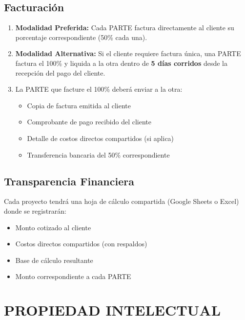 \documentclass[11pt,letterpaper]{article}
\begin{document}
\subsection{Facturación}

\begin{enumerate}[label=\arabic*.]
    \item \textbf{Modalidad Preferida:} Cada PARTE factura directamente al cliente su porcentaje correspondiente (50\% cada una).
    
    \item \textbf{Modalidad Alternativa:} Si el cliente requiere factura única, una PARTE factura el 100\% y liquida a la otra dentro de \textbf{5 días corridos} desde la recepción del pago del cliente.
    
    \item La PARTE que facture el 100\% deberá enviar a la otra:
    \begin{itemize}
        \item Copia de factura emitida al cliente
        \item Comprobante de pago recibido del cliente
        \item Detalle de costos directos compartidos (si aplica)
        \item Transferencia bancaria del 50\% correspondiente
    \end{itemize}
\end{enumerate}

\subsection{Transparencia Financiera}

Cada proyecto tendrá una hoja de cálculo compartida (Google Sheets o Excel) donde se registrarán:
\begin{itemize}
    \item Monto cotizado al cliente
    \item Costos directos compartidos (con respaldos)
    \item Base de cálculo resultante
    \item Monto correspondiente a cada PARTE
\end{itemize}


\section{PROPIEDAD INTELECTUAL}
\end{document}
